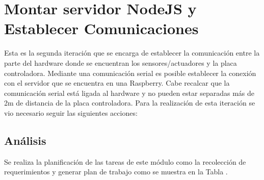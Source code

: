 \documentclass[11pt,letterpaper]{report}
\begin{document}
	\section{Montar servidor  NodeJS y Establecer Comunicaciones}
	Esta es la segunda iteración que se encarga de establecer la comunicación entre la parte del hardware donde se encuentran los sensores/actuadores y la placa controladora. Mediante una comunicación serial es posible establecer la conexión con el servidor que se encuentra  en una Raspberry. Cabe recalcar que la comunicación serial está ligada al hardware y no pueden estar separadas más de 2m de distancia de la placa controladora.
Para la realización de esta iteración se vio necesario seguir las siguientes acciones:

	\subsection{Análisis}
	Se realiza la planificación de las tareas de este módulo  como la recolección de requerimientos y generar plan de trabajo como se muestra en la Tabla .
	
			
\end{document}
